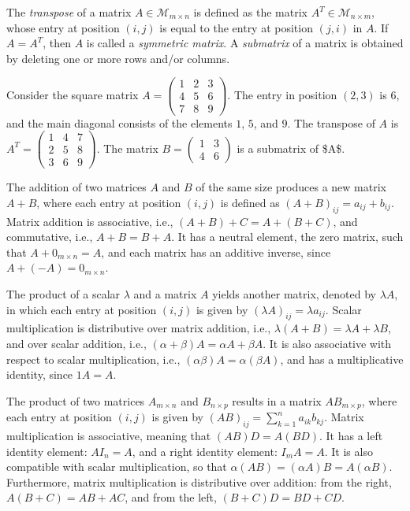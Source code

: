 The \emph{transpose} of a matrix $A \in \mathcal{M}_{m \times n}$ is defined as the matrix $A^T \in \mathcal{M}_{n \times m}$, whose entry at position $(i,j)$ is equal to the entry at position $(j,i)$ in $A$. If $A = A^T$, then $A$ is called a \emph{symmetric matrix}. A \emph{submatrix} of a matrix is obtained by deleting one or more rows and/or columns.

\begin{example}
Consider the square matrix $A = \left( \begin{smallmatrix} 1 & 2 & 3 \\ 4 & 5 & 6 \\ 7 & 8 & 9 \end{smallmatrix} \right)$. The entry in position $(2, 3)$ is $6$, and the main diagonal consists of the elements $1$, $5$, and $9$. The transpose of $A$ is $A^T = \left( \begin{smallmatrix} 1 & 4 & 7 \\ 2 & 5 & 8 \\ 3 & 6 & 9 \end{smallmatrix} \right)$. The matrix $B = \left( \begin{smallmatrix} 1 & 3 \\ 4 & 6 \end{smallmatrix} \right)$ is a submatrix of \$A\$.
\end{example}

The addition of two matrices $A$ and $B$ of the same size produces a new matrix $A + B$, where each entry at position $(i, j)$ is defined as $(A + B)_{ij} = a_{ij} + b_{ij}$. Matrix addition is associative, i.e., $(A + B) + C = A + (B + C)$, and commutative, i.e., $A + B = B + A$. It has a neutral element, the zero matrix, such that $A + 0_{m \times n} = A$, and each matrix has an additive inverse, since $A + (-A) = 0_{m \times n}$.

The product of a scalar $\lambda$ and a matrix $A$ yields another matrix, denoted by $\lambda A$, in which each entry at position $(i, j)$ is given by $(\lambda A)_{ij} = \lambda a_{ij}$. Scalar multiplication is distributive over matrix addition, i.e., $\lambda (A + B) = \lambda A + \lambda B$, and over scalar addition, i.e., $(\alpha + \beta) A = \alpha A + \beta A$. It is also associative with respect to scalar multiplication, i.e., $(\alpha \beta) A = \alpha (\beta A)$, and has a multiplicative identity, since $1 A = A$.

The product of two matrices $A_{m \times n}$ and $B_{n \times p}$ results in a matrix $AB_{m \times p}$, where each entry at position $(i, j)$ is given by $(AB)_{ij} = \sum_{k=1}^n a_{ik} b_{kj}$. Matrix multiplication is associative, meaning that $(AB)D = A(BD)$. It has a left identity element: $AI_n = A$, and a right identity element: $I_mA = A$. It is also compatible with scalar multiplication, so that $\alpha(AB) = (\alpha A)B = A(\alpha B)$. Furthermore, matrix multiplication is distributive over addition: from the right, $A(B + C) = AB + AC$, and from the left, $(B + C)D = BD + CD$.

